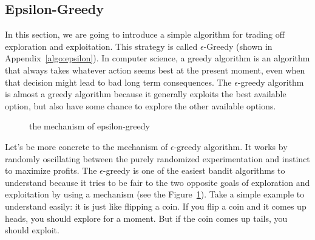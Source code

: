 \subsection{Epsilon-Greedy}
\label{subsec:greedy}

In this section, we are going to introduce a simple algorithm for trading off exploration and exploitation. This strategy is called $\epsilon$-Greedy\cite{Sutton98} (shown in Appendix~\ref{algo:epsilon}). In computer science, a greedy algorithm is an algorithm that always takes whatever action seems best at the present moment, even when that decision might lead to bad long term consequences. The $\epsilon$-greedy algorithm is almost a greedy algorithm because it generally exploits the best available option, but also have some chance to explore the other available options. 
\begin{figure}[!h]
\caption{the mechanism of epsilon-greedy}
\label{fig:epsilon}
\end{figure}

Let's be more concrete to the mechanism of $\epsilon$-greedy algorithm. It works by randomly oscillating between the purely randomized experimentation and instinct to maximize profits. The $\epsilon$-greedy is one of the easiest bandit algorithms to understand because it tries to be fair to the two opposite goals of exploration and exploitation by using a mechanism (see the Figure~\ref{fig:epsilon}). Take a simple example to understand easily: it is just like flipping a coin. If you flip a coin and it comes up heads, you should explore for a moment. But if the coin comes up tails, you should exploit.

